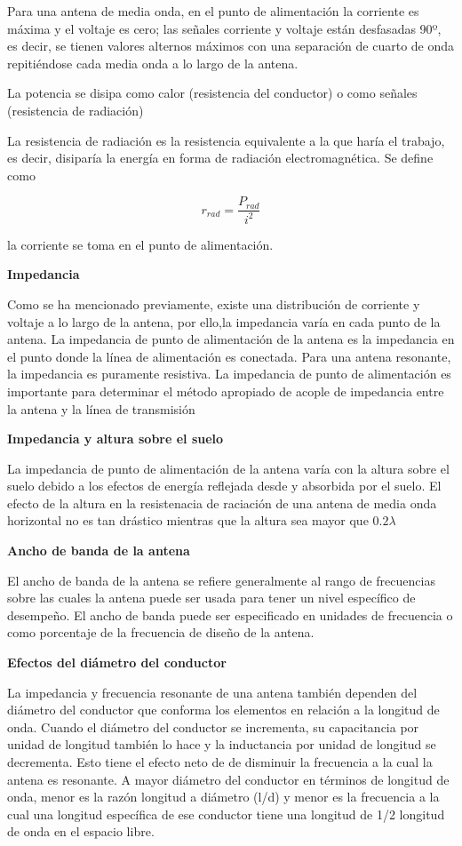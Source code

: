 \documentclass[12pt,letterpaper,titlepage,twoside]{book}
\begin{document}
Para una antena de media onda, en el punto de alimentación la corriente es máxima y el voltaje es cero; las señales corriente y voltaje están desfasadas 90º, es decir, se tienen valores alternos máximos con una separación de cuarto de onda repitiéndose cada media onda a lo largo de la antena.

La potencia se disipa como calor (resistencia del conductor) o como señales (resistencia de radiación)

La resistencia de radiación es la resistencia equivalente a la que haría el trabajo, es decir, disiparía la energía en forma de radiación electromagnética. Se define como 

\begin{equation}
r_{rad} = \frac{P_{rad}}{i^2}
\end{equation}
 
la corriente se toma en el punto de alimentación.

\textbf{Impedancia}

Como se ha mencionado previamente, existe una distribución de corriente y voltaje a lo largo de la antena, por ello,la impedancia varía en cada punto de la antena. La impedancia de punto de alimentación de la antena es la impedancia en el punto donde la línea de alimentación es conectada. Para una antena resonante, la impedancia es puramente resistiva.
La impedancia de punto de alimentación es importante para determinar el método apropiado de acople de impedancia entre la antena y la línea de transmisión

\textbf{Impedancia y altura sobre el suelo}

La impedancia de punto de alimentación de la antena varía con la altura sobre el suelo debido a los efectos de energía reflejada desde y absorbida por el suelo.
El efecto de la altura en la resistenacia de raciación de una antena de media onda horizontal no es tan drástico mientras que la altura sea mayor que $0.2 \lambda$


\textbf{Ancho de banda de la antena}

El ancho de banda de la antena se refiere generalmente al rango de frecuencias sobre las cuales la antena puede ser usada para tener un nivel específico de desempeño. El ancho de banda puede ser especificado en unidades de frecuencia o como porcentaje de la frecuencia de diseño de la antena.

\textbf{Efectos del diámetro del conductor}

La impedancia y frecuencia resonante de una antena también dependen del diámetro del conductor que conforma los elementos en relación a la longitud de onda. Cuando el diámetro del conductor se incrementa, su capacitancia por unidad de longitud también lo hace y la inductancia por unidad de longitud se decrementa. Esto tiene el efecto neto de de disminuir la frecuencia a la cual la antena es resonante. A mayor diámetro del conductor en términos de longitud de onda,  menor  es la razón longitud a diámetro (l/d) y menor es la frecuencia a la cual una longitud específica de ese conductor tiene una longitud de 1/2 longitud de onda en el espacio libre.
\end{document}
